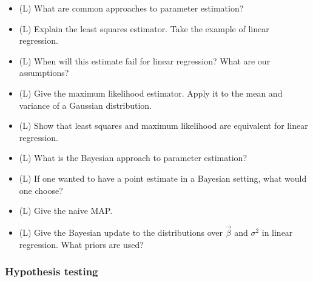 \begin{itemize}
    \item (L) What are common approaches to parameter estimation?
    \item (L) Explain the least squares estimator. Take the example of linear regression.
    \item (L) When will this estimate fail for linear regression? What are our assumptions?
    \item (L) Give the maximum likelihood estimator. Apply it to the mean and variance of a Gaussian distribution.
    \item (L) Show that least squares and maximum likelihood are equivalent for linear regression.
    \item (L) What is the Bayesian approach to parameter estimation?
    \item (L) If one wanted to have a point estimate in a Bayesian setting, what would one choose?
    \item (L) Give the naive MAP.
    \item (L) Give the Bayesian update to the distributions over $\vec{\beta}$ and $\sigma^2$ in linear regression.
    What priors are used?
\end{itemize}

\subsubsection*{Hypothesis testing}

